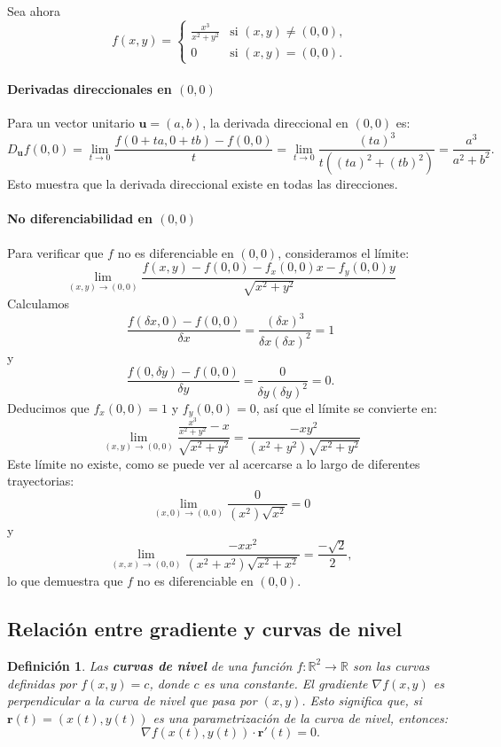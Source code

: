 \documentclass[11pt]{book}
\theoremstyle{definicion}
\newtheorem{definicion}{Definición}[section]
\theoremstyle{teorema}
\theoremstyle{ejemplo}
\begin{document}
\medskip

\noindent Sea ahora
\[ f(x, y) = \begin{cases}
\displaystyle \frac{x^3}{x^2 + y^2} & \text{si } (x, y) \neq (0, 0), \\
0 & \text{si } (x, y) = (0, 0).
\end{cases} \]

\paragraph{Derivadas direccionales en \((0, 0)\)}
Para un vector unitario \(\mathbf{u} = (a, b)\), la derivada direccional en \((0, 0)\) es:
\[ D_{\mathbf{u}} f(0, 0) = 
\lim_{t \rightarrow 0}
\frac{f(0+ta,0+tb) - f(0,0)}{t} = 
\lim_{t \rightarrow 0}
\frac{(ta)^3}{t( (ta)^2 + (tb)^2)} = 
\frac{a^3}{a^2 + b^2}. \]
Esto muestra que la derivada direccional existe en todas las direcciones.

\paragraph{No diferenciabilidad en \((0, 0)\)}
Para verificar que \(f\) no es diferenciable en \((0, 0)\), consideramos el límite:
\[ \lim_{(x, y) \to (0, 0)} \frac{f(x, y) - f(0, 0) - f_x(0, 0) x - f_y(0, 0) y}{\sqrt{x^2 + y^2}} \]
Calculamos
\[
\frac{f(\delta x,0)-f(0,0)}{\delta x} = \frac{(\delta x)^3}{\delta x (\delta x)^2} =1
\]
y
\[
\frac{f(0, \delta y)-f(0,0)}{\delta y} = \frac{0}{\delta y (\delta y)^2} = 0.
\]
Deducimos que \(f_x(0, 0) = 1\) y \(f_y(0, 0) = 0\), así que el límite se convierte en:
\[ \lim_{(x, y) \to (0, 0)} \frac{\frac{x^3}{x^2 + y^2} - x}{\sqrt{x^2 + y^2}} 
= \frac{- x y^2}{(x^2 + y^2) \sqrt{x^2 + y^2}}
\]
Este límite no existe, como se puede ver al acercarse a lo largo de diferentes trayectorias: 
\[ \lim_{(x, 0) \to (0, 0)} %
\frac{0}{(x^2) \sqrt{x^2}} = 0
\]
y
\[ \lim_{(x, x) \to (0, 0)} %
\frac{- x x^2}{(x^2 + x^2) \sqrt{x^2 + x^2}} = \frac{-\sqrt{2}}{2},
\]
lo que demuestra que \(f\) no es diferenciable en \((0, 0)\).

\subsection{Relación entre gradiente y curvas de nivel}

\begin{definicion}
Las \textbf{curvas de nivel} de una función \( f: \mathbb{R}^2 \to \mathbb{R} \) son las curvas definidas por \( f(x, y) = c \), donde \( c \) es una constante. El gradiente \( \nabla f(x, y) \) es perpendicular a la curva de nivel que pasa por \( (x, y) \). Esto significa que, si \( \mathbf{r}(t) = (x(t), y(t)) \) es una parametrización de la curva de nivel, entonces:
\[
\nabla f(x(t), y(t)) \cdot \mathbf{r}'(t) = 0.
\]
\end{definicion}
\end{document}
